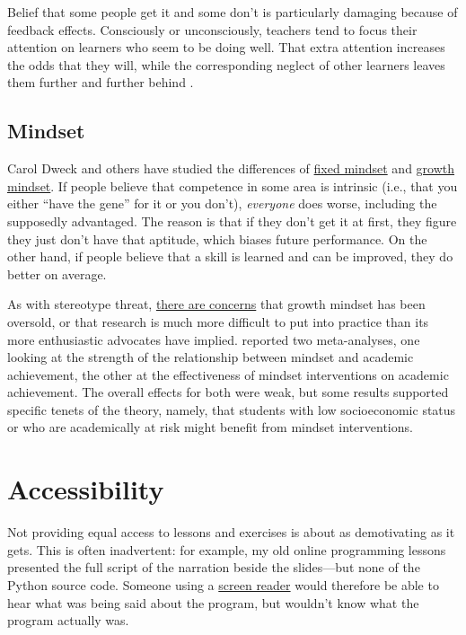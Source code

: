 Belief that some people get it and some don't is particularly damaging
because of feedback effects. Consciously or unconsciously, teachers tend
to focus their attention on learners who seem to be doing well. That
extra attention increases the odds that they will, while the
corresponding neglect of other learners leaves them further and further
behind \cite{Alvi1999,Brop1983,Juss2005}.

\subsection{Mindset}\label{mindset}

Carol Dweck and others have studied the differences of
\protect\hyperlink{g:fixed-mindset}{fixed mindset} and
\protect\hyperlink{g:growth-mindset}{growth mindset}. If people believe that
competence in some area is intrinsic (i.e., that you either ``have the
gene'' for it or you don't), \emph{everyone} does worse, including the
supposedly advantaged. The reason is that if they don't get it at first,
they figure they just don't have that aptitude, which biases future
performance. On the other hand, if people believe that a skill is
learned and can be improved, they do better on average.

As with stereotype threat, \href{https://educhatter.wordpress.com/2017/03/26/growth-mindset-is-the-theory-flawed-or-has-gm-been-debased-in-the-classroom/}{there are concerns}
that growth mindset has been oversold, or that research is much more
difficult to put into practice than its more enthusiastic advocates
have implied. \cite{Sisk2018} reported two meta-analyses, one
looking at the strength of the relationship between mindset and
academic achievement, the other at the effectiveness of mindset
interventions on academic achievement. The overall effects for both
were weak, but some results supported specific tenets of the theory,
namely, that students with low socioeconomic status or who are
academically at risk might benefit from mindset interventions.

\section{Accessibility}\label{s:motivation-accessibility}

Not providing equal access to lessons and exercises is about as
demotivating as it gets. This is often inadvertent: for example, my
old online programming lessons presented the full script of the
narration beside the slides---but none of the Python source
code. Someone using a \href{https://en.wikipedia.org/wiki/Screen\_reader}{screen reader} would therefore
be able to hear what was being said about the program, but wouldn't
know what the program actually was.

